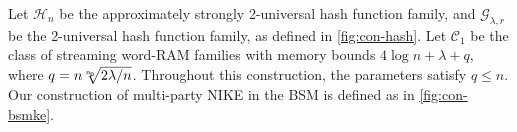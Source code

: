  Let $\mathcal H_n$ be the approximately strongly 2-universal hash function family, and $\mathcal G_{\lambda,r}$ be the 2-universal hash function family, as defined in \cref{fig:con-hash}. Let $\mathcal C_1$ be the class of streaming word-RAM families with memory bounds $4\log n+\lambda+q$, where $q=n\sqrt[\mathsf{n_p}]{2\lambda/n}$.
Throughout this construction, the parameters satisfy $q\leq n$.
Our construction of multi-party NIKE in the BSM is defined as in \cref{fig:con-bsmke}.

\begin{figure}[htpb]
\begin{center}
\end{center}
\end{figure}
